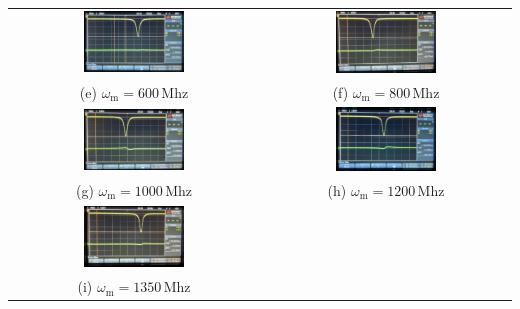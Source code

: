 \begin{center}
    \captionsetup{type=figure}
    \begin{tabular}{c c}
        \includegraphics[width=0.42\textwidth]{Bilder/Modulationsindex/mindex_600.jpg} 
        & \includegraphics[width=0.42\textwidth]{Bilder/Modulationsindex/mindex_800.jpg} \\
        (e) $\omega_\mathrm{m} = 600$\,Mhz & (f) $\omega_\mathrm{m} = 800$\,Mhz \\[0,3cm]
        \includegraphics[width=0.42\textwidth]{Bilder/Modulationsindex/mindex_1000.jpg}
        & \includegraphics[width=0.42\textwidth]{Bilder/Modulationsindex/mindex_1200.jpg} \\
        (g) $\omega_\mathrm{m} = 1000$\,Mhz & (h) $\omega_\mathrm{m} = 1200$\,Mhz \\[0,3cm]
        \includegraphics[width=0.42\textwidth]{Bilder/Modulationsindex/mindex_1350.jpg} & \\
        (i) $\omega_\mathrm{m} = 1350$\,Mhz & \\
    \end{tabular}
    \label{fig:mindex2}
\end{center}

